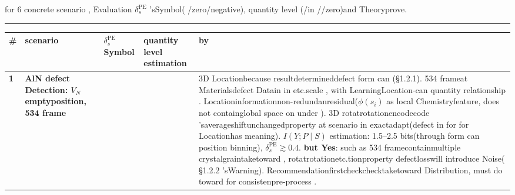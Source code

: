 \documentclass[
  12pt,
]{article}
\begin{document}
for  6 concrete scenario , Evaluation \(\delta_s^{\text{PE}}\)
'sSymbol( /zero/negative), quantity level (/in //zero)and Theoryprove. 

\begin{center}\rule{0.5\linewidth}{0.5pt}\end{center}

\begin{longtable}[]{@{}
  >{\raggedright\arraybackslash}p{}
  >{\raggedright\arraybackslash}p{}
  >{\raggedright\arraybackslash}p{}
  >{\raggedright\arraybackslash}p{}
  >{\raggedright\arraybackslash}p{}@{}}
\toprule\noalign{}
\begin{minipage}[b]{\linewidth}\raggedright
\#
\end{minipage} & \begin{minipage}[b]{\linewidth}\raggedright
scenario 
\end{minipage} & \begin{minipage}[b]{\linewidth}\raggedright
\(\delta_s^{\text{PE}}\) Symbol
\end{minipage} & \begin{minipage}[b]{\linewidth}\raggedright
quantity level estimation
\end{minipage} & \begin{minipage}[b]{\linewidth}\raggedright
by 
\end{minipage} \\
\midrule\noalign{}
\endhead
\bottomrule\noalign{}
\endlastfoot
\textbf{1} & \textbf{AlN defect Detection: \(V_N\) emptyposition, 534 frame} & \textbf{ } &
\textbf{} & 3D Locationbecause resultdetermineddefect form can (§1.2.1). 534
frameat Materialsdefect Datain in etc.scale , with LearningLocation-can quantity relationship . Locationinformationnon-redundanresidual(\(\phi(s_i)\)
as local Chemistryfeature, does not containglobal space on under ). 3D
rotatrotationencodecode 'saverageshiftunchangedproperty at scenario in exactadapt(defect in for for Locationhas meaning). \(I(Y; P \mid S)\)
estimation: 1.5--2.5 bits(through form can position
binning), \(\delta_s^{\text{PE}} \gtrsim 0.4\). \textbf{but Yes}: such as  534
framecontainmultiple crystalgraintaketoward , rotatrotationetc.tionproperty defectlosswill introduce Noise(  §1.2.2
'sWarning). Recommendationfirstcheckchecktaketoward Distribution, must do toward for consistenpre-process .  \\

\end{longtable}
\end{document}
